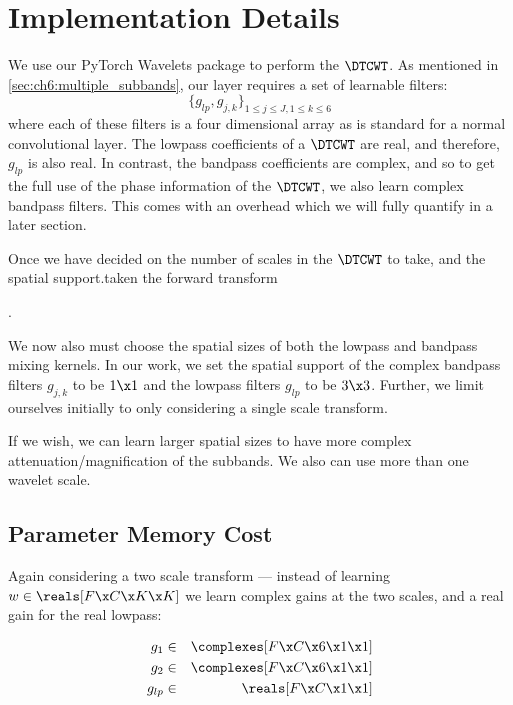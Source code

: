 \section{Implementation Details}

We use our PyTorch Wavelets package \cite{} to perform the $\DTCWT$. As
mentioned in \autoref{sec:ch6:multiple_subbands}, our layer requires a set
of learnable filters:
\begin{equation}
  \{ g_{lp}, g_{j,k} \}_{1\leq j \leq J, 1\leq k\leq 6}
\end{equation}
where each of these filters is a four dimensional array as is standard for a
normal convolutional layer. The lowpass coefficients of a $\DTCWT$ are real, and
therefore, $g_{lp}$ is also real. In contrast, the bandpass coefficients are
complex, and so to get the full use of the phase information of the $\DTCWT$, we
also learn complex bandpass filters. This comes with an overhead which we will 
fully quantify in a later section.

Once we have decided on the number of scales in the $\DTCWT$ to take, and the
spatial support.taken the forward transform

. 

We now also must choose the spatial sizes of both the lowpass and bandpass
mixing kernels. In our work, we set the spatial support of the complex bandpass
filters $g_{j,k}$ to be $1\x 1$ and the lowpass filters $g_{lp}$ to be $3\x 3$.
Further, we limit ourselves initially to only considering a single scale
transform.

If we wish, we can learn larger spatial sizes to have more complex
attenuation/magnification of the subbands. We also can use more than
one wavelet scale. 

\subsection{Parameter Memory Cost}
Again considering a two scale transform --- instead of learning $w\in \reals[F
\x C\x K\x K]$ we learn complex gains at the two scales, and a real gain for the
real lowpass:

\begin{eqnarray*}
  g_1 &\in& \complexes[F\x C\x 6\x 1\x 1] \\
  g_2 &\in& \complexes[F\x C\x 6\x 1\x 1] \\
  g_{lp} &\in& \reals[F\x C\x 1\x 1]
\end{eqnarray*}


